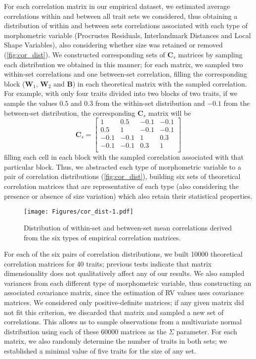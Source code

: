 \documentclass[12pt,]{article}
\begin{document}
For each correlation matrix in our empirical dataset, we estimated
average correlations within and between all trait sets we considered,
thus obtaining a distribution of within and between sets correlations
associated with each type of morphometric variable (Procrustes
Residuals, Interlandmark Distances and Local Shape Variables), also
considering whether size was retained or removed
(\autoref{fig:cor_dist}). We constructed corresponding sets of
$\mathbf{C}_{s}$ matrices by sampling each distribution we obtained in
this manner; for each matrix, we sampled two within-set correlations and
one between-set correlation, filling the corresponding block
($\mathbf{W}_1$, $\mathbf{W}_2$ and $\mathbf{B}$) in each theoretical
matrix with the sampled correlation. For example, with only four traits
divided into two blocks of two traits, if we sample the values $0.5$ and
$0.3$ from the within-set distribution and $-0.1$ from the between-set
distribution, the corresponding $\mathbf{C}_{s}$ matrix will be \[
\mathbf{C}_s =
\begin{bmatrix}
1 & 0.5 & -0.1 & -0.1 \\
0.5 & 1 & -0.1 & -0.1 \\
-0.1 & -0.1 & 1 & 0.3 \\
-0.1 & -0.1 & 0.3 & 1 \\
\end{bmatrix}
\] filling each cell in each block with the sampled correlation
associated with that particular block. Thus, we abstracted each type of
morphometric variable to a pair of correlation distributions
(\autoref{fig:cor_dist}), building six sets of theoretical correlation
matrices that are representative of each type (also considering the
presence or absence of size variation) which also retain their
statistical properties.

\begin{figure}[htbp]
\centering
\texttt{[image: Figures/cor\_dist-1.pdf]}
\caption{Distribution of within-set and between-set mean correlations
derived from the six types of empirical correlation matrices.
\label{fig:cor_dist}}
\end{figure}

For each of the six pairs of correlation distributions, we built 10000
theoretical correlation matrices for 40 traits; previous tests indicate
that matrix dimensionality does not qualitatively affect any of our
results. We also sampled variances from each different type of
morphometric variable, thus constructing an associated covariance
matrix, since the estimation of RV values uses covariance matrices. We
considered only positive-definite matrices; if any given matrix did not
fit this criterion, we discarded that matrix and sampled a new set of
correlations. This allows us to sample observations from a multivariate
normal distribution using each of these 60000 matrices as the $\Sigma$
parameter. For each matrix, we also randomly determine the number of
traits in both sets; we established a minimal value of five traits for
the size of any set.
\end{document}
